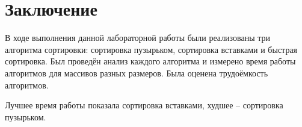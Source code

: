 \chapter*{Заключение}

В ходе выполнения данной лабораторной работы были реализованы три алгоритма сортировки: сортировка пузырьком, сортировка вставками и быстрая сортировка. Был проведён анализ каждого алгоритма и измерено время работы алгоритмов для массивов разных размеров. Была оценена трудоёмкость алгоритмов.

Лучшее время работы показала сортировка вставками, худшее -- сортировка пузырьком.
